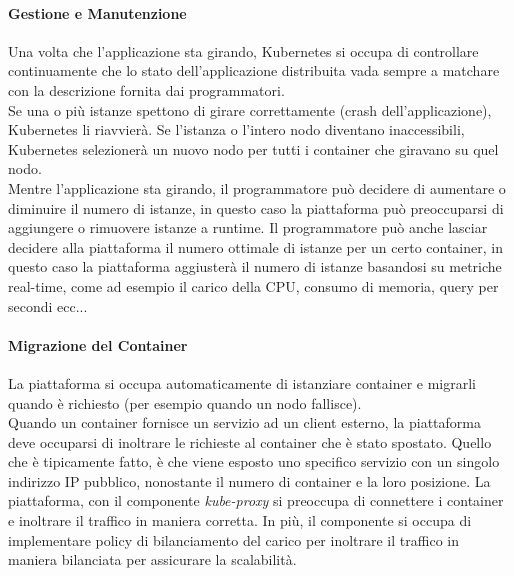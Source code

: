 \documentclass{article}
\begin{document}
\paragraph{Gestione e Manutenzione}
Una volta che l'applicazione sta girando, Kubernetes si occupa di controllare continuamente che lo stato dell'applicazione distribuita vada sempre a matchare con la descrizione fornita dai programmatori. \\
Se una o più istanze spettono di girare correttamente (crash dell'applicazione), Kubernetes li riavvierà. Se l'istanza o l'intero nodo diventano inaccessibili, Kubernetes selezionerà un nuovo nodo per tutti i container che giravano su quel nodo. \\
Mentre l'applicazione sta girando, il programmatore può decidere di aumentare o diminuire il numero di istanze, in questo caso la piattaforma può preoccuparsi di aggiungere o rimuovere istanze a runtime. Il programmatore può anche lasciar decidere alla piattaforma il numero ottimale di istanze per un certo container, in questo caso la piattaforma aggiusterà il numero di istanze basandosi su metriche real-time, come ad esempio il carico della CPU, consumo di memoria, query per secondi ecc...

\paragraph{Migrazione del Container}
La piattaforma si occupa automaticamente di istanziare container e migrarli quando è richiesto (per esempio quando un nodo fallisce). \\
Quando un container fornisce un servizio ad un client esterno, la piattaforma deve occuparsi di inoltrare le richieste al container che è stato spostato. Quello che è tipicamente fatto, è che viene esposto uno specifico servizio con un singolo indirizzo IP pubblico, nonostante il numero di container e la loro posizione. La piattaforma, con il componente \textit{kube-proxy} si preoccupa di connettere i container e inoltrare il traffico in maniera corretta. In più, il componente si occupa di implementare policy di bilanciamento del carico per inoltrare il traffico in maniera bilanciata per assicurare la scalabilità.
\end{document}

